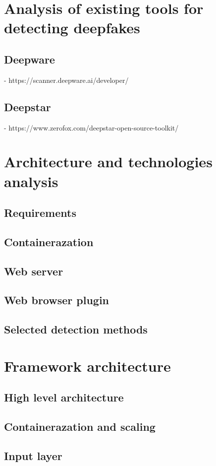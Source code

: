 \chapter{Analysis of existing tools for detecting deepfakes}
\section{Deepware}
    - https://scanner.deepware.ai/developer/
\section{Deepstar}
    - https://www.zerofox.com/deepstar-open-source-toolkit/


\chapter{Architecture and technologies analysis}
\section{Requirements}
\section{Containerazation}
\section{Web server}
\section{Web browser plugin}
\section{Selected detection methods}

\chapter{Framework architecture}
\section{High level architecture}
\section{Containerazation and scaling}
\section{Input layer}

